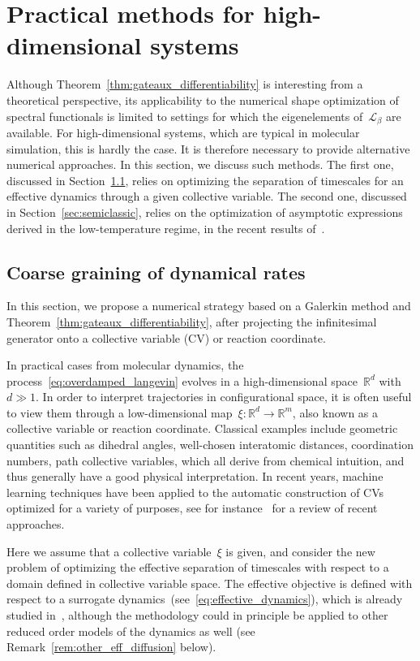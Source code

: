 \documentclass[a4]{article}
\newcommand{\cL}{\mathcal{L}}
\newcommand{\R}{\mathbb{R}}
\newcommand{\1}{\mathbbm 1}
\begin{document}
\section{Practical methods for high-dimensional systems}
\label{sec:practical_opt}
Although Theorem~\ref{thm:gateaux_differentiability} is interesting from a theoretical perspective, its applicability to the numerical shape optimization of spectral functionals is limited to settings for which the eigenelements of~$\cL_\beta$ are available.
For high-dimensional systems, which are typical in molecular simulation, this is hardly the case. It is therefore necessary to provide alternative numerical approaches.
In this section, we discuss such methods. The first one, discussed in Section~\ref{sec:coarse_graining}, relies on optimizing the separation of timescales for an effective dynamics through a given collective variable. 
The second one, discussed in Section~\ref{sec:semiclassic}, relies on the optimization of asymptotic expressions derived in the low-temperature regime, in the recent results of~\cite{BLS24}.
\subsection{Coarse graining of dynamical rates}
    \label{sec:coarse_graining}
    In this section, we propose a numerical strategy based on a Galerkin method and Theorem~\ref{thm:gateaux_differentiability}, after projecting the infinitesimal generator onto a collective variable (CV) or reaction coordinate.

    In practical cases from molecular dynamics, the process~\eqref{eq:overdamped_langevin} evolves in a high-dimensional space~$\R^d$ with~$d\gg 1$. In order to interpret trajectories in configurational space, it is often useful to view them through a low-dimensional map~$\xi:\R^d\to\R^m$, also known as a collective variable or reaction coordinate.
    Classical examples include geometric quantities such as dihedral angles, well-chosen interatomic distances, coordination numbers, path collective variables, which all derive from chemical intuition, and thus generally have a good physical interpretation.
    In recent years, machine learning techniques have been applied to the automatic construction of CVs optimized for a variety of purposes, see for instance~\cite{F18,GSal20,C21,GHRCNL21} for a review of recent approaches.

    Here we assume that a collective variable~$\xi$ is given, and consider the new problem of optimizing the effective separation of timescales with respect to a domain defined in collective variable space.
    The effective objective is defined with respect to a surrogate dynamics~(see~\eqref{eq:effective_dynamics}), which is already studied in~\cite{LL10,ZHS16,NKBC21}, although the methodology could in principle be applied to other reduced order models of the dynamics as well (see Remark~\ref{rem:other_eff_diffusion} below).
\end{document}
